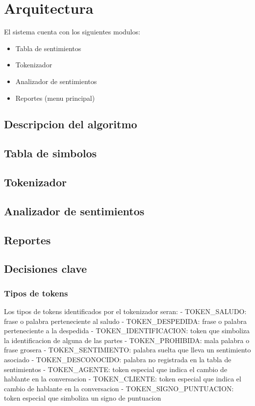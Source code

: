 \section{Arquitectura}

El sistema cuenta con los siguientes modulos:

\begin{itemize}
    \item Tabla de sentimientos
    \item Tokenizador
    \item Analizador de sentimientos
    \item Reportes (menu principal)
\end{itemize}

\subsection{Descripcion del algoritmo}

\subsection{Tabla de simbolos}
\subsection{Tokenizador}
\subsection{Analizador de sentimientos}
\subsection{Reportes}

\subsection{Decisiones clave}

\subsubsection{Tipos de tokens}
Los tipos de tokens identificados por el tokenizador seran:
- TOKEN_SALUDO: frase o palabra perteneciente al saludo
- TOKEN_DESPEDIDA: frase o palabra perteneciente a la despedida
- TOKEN_IDENTIFICACION: token que simboliza la identificacion de alguna de las partes
- TOKEN_PROHIBIDA: mala palabra o frase grosera
- TOKEN_SENTIMIENTO: palabra suelta que lleva un sentimiento asociado
- TOKEN_DESCONOCIDO: palabra no registrada en la tabla de sentimientos
- TOKEN_AGENTE: token especial que indica el cambio de hablante en la conversacion
- TOKEN_CLIENTE: token especial que indica el cambio de hablante en la conversacion
- TOKEN_SIGNO_PUNTUACION: token especial que simboliza un signo de puntuacion

